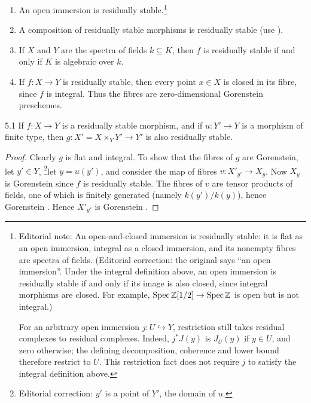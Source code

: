 \begin{example*}
\begin{enumerate}
\item An open immersion is residually stable.\footnote{Editorial note: An open-and-closed immersion is residually stable: it is flat as an open immersion, integral as a closed immersion, and its nonempty fibres are spectra of fields. (Editorial correction: the original says ``an open immersion''. Under the integral definition above, an open immersion is residually stable if and only if its image is also closed, since integral morphisms are closed. For example, $\operatorname{Spec}\mathbb Z[1/2]\to\operatorname{Spec}\mathbb Z$ is open but is not integral.)
\par For an arbitrary open immersion $j\colon U\hookrightarrow Y$, restriction still takes residual complexes to residual complexes. Indeed, $j^*J(y)$ is $J_U(y)$ if $y\in U$, and zero otherwise; the defining decomposition, coherence and lower bound therefore restrict to $U$. This restriction fact does not require $j$ to satisfy the integral definition above.}
\item A composition of residually stable morphisms is residually stable (use ).
\item If $X$ and $Y$ are the spectra of fields $k\subseteq K$, then $f$ is residually stable if and only if $K$ is algebraic over $k$.
\item If $f\colon X\to Y$ is residually stable, then every point $x\in X$ is closed in its fibre, since $f$ is integral. Thus the fibres are zero-dimensional Gorenstein preschemes.
\end{enumerate}
\end{example*}

\begin{bookproposition}{5.1}\label{prop:6.5.1}
If $f\colon X\to Y$ is a residually stable morphism, and if $u\colon Y'\to Y$ is a morphism of finite type, then $g\colon X' = X\times_Y Y'\to Y'$ is also residually stable.
\end{bookproposition}

\begin{proof}
Clearly $g$ is flat and integral. To show that the fibres of $g$ are Gorenstein, let $y'\in Y$, \footnote{Editorial correction: $y'$ is a point of $Y'$, the domain of $u$.}let $y = u(y')$, and consider the map of fibres $v\colon X'_{y'}\to X_{y}$. Now $X_{y}$ is Gorenstein since $f$ is residually stable. The fibres of $v$ are tensor products of fields, one of which is finitely generated (namely $k(y')/k(y)$), hence Gorenstein . Hence $X'_{y'}$ is Gorenstein .
\end{proof}

